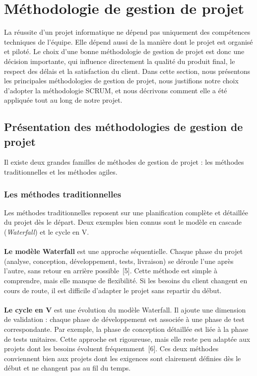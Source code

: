 \section{Méthodologie de gestion de projet}
La réussite d’un projet informatique ne dépend pas uniquement des compétences techniques de l’équipe. Elle dépend aussi de la manière dont le projet est organisé et piloté. Le choix d’une bonne méthodologie de gestion de projet est donc une décision importante, qui influence directement la qualité du produit final, le respect des délais et la satisfaction du client. Dans cette section, nous présentons les principales méthodologies de gestion de projet, nous justifions notre choix d’adopter la méthodologie SCRUM, et nous décrivons comment elle a été appliquée tout au long de notre projet.
\subsection{Présentation des méthodologies de gestion de projet}

Il existe deux grandes familles de méthodes de gestion de projet : les méthodes traditionnelles et les méthodes agiles.

\subsubsection{Les méthodes traditionnelles}
Les méthodes traditionnelles reposent sur une planification complète et détaillée du projet dès le départ. Deux exemples bien connus sont le modèle en cascade (\textit{Waterfall}) et le cycle en V.\\
\\\textbf{Le modèle Waterfall} est une approche séquentielle. Chaque phase du projet (analyse, conception, développement, tests, livraison) se déroule l'une après l'autre, sans retour en arrière possible~[5]. Cette méthode est simple à comprendre, mais elle manque de flexibilité. Si les besoins du client changent en cours de route, il est difficile d'adapter le projet sans repartir du début.\\
\\\textbf{Le cycle en V } est une évolution du modèle Waterfall. Il ajoute une dimension de validation : chaque phase de développement est associée à une phase de test correspondante. Par exemple, la phase de conception détaillée est liée à la phase de tests unitaires. Cette approche est rigoureuse, mais elle reste peu adaptée aux projets dont les besoins évoluent fréquemment~[6].
Ces deux méthodes conviennent bien aux projets dont les exigences sont clairement définies dès le début et ne changent pas au fil du temps.

